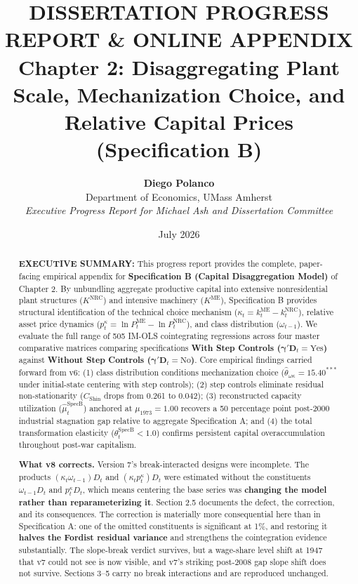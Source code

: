 \documentclass[11pt,a4paper]{article}
\title{\textbf{DISSERTATION PROGRESS REPORT \& ONLINE APPENDIX} \\[0.5em] \Large \textbf{Chapter 2: Disaggregating Plant Scale, Mechanization Choice, and Relative Capital Prices (Specification B)}}
\author{\textbf{Diego Polanco} \\ Department of Economics, UMass Amherst \\ \textit{Executive Progress Report for Michael Ash and Dissertation Committee}}
\date{July 2026}
\begin{document}
\maketitle

\begin{abstract}
\noindent \textbf{EXECUTIVE SUMMARY:} This progress report provides the complete, paper-facing empirical appendix for \textbf{Specification B (Capital Disaggregation Model)} of Chapter 2. By unbundling aggregate productive capital into extensive nonresidential plant structures ($K^{\text{NRC}}$) and intensive machinery ($K^{\text{ME}}$), Specification B provides structural identification of the technical choice mechanism ($\kappa_t = k^{\text{ME}}_t - k^{\text{NRC}}_t$), relative asset price dynamics ($p_t^{\kappa} = \ln P^{\text{ME}}_t - \ln P^{\text{NRC}}_t$), and class distribution ($\omega_{t-1}$). We evaluate the full range of 505 IM-OLS cointegrating regressions across four master comparative matrices comparing specifications \textbf{With Step Controls ($\boldsymbol{\gamma}'\mathbf{D}_t = \text{Yes}$)} against \textbf{Without Step Controls ($\boldsymbol{\gamma}'\mathbf{D}_t = \text{No}$)}. Core empirical findings carried forward from v6: (1) class distribution conditions mechanization choice ($\hat{\theta}_{\omega \kappa} = 15.40^{***}$ under initial-state centering with step controls); (2) step controls eliminate residual non-stationarity ($C_{\text{Shin}}$ drops from 0.261 to 0.042); (3) reconstructed capacity utilization ($\hat{\mu}_t^{\text{SpecB}}$) anchored at $\mu_{1973} = 1.00$ recovers a 50 percentage point post-2000 industrial stagnation gap relative to aggregate Specification A; and (4) the total transformation elasticity ($\theta_t^{\text{SpecB}} < 1.0$) confirms persistent capital overaccumulation throughout post-war capitalism.

\noindent \textbf{What v8 corrects.} Version 7's break-interacted designs were incomplete. The products $(\kappa_t\omega_{t-1})D_t$ and $(\kappa_t p_t^{\kappa})D_t$ were estimated without the constituents $\omega_{t-1}D_t$ and $p_t^{\kappa}D_t$, which means centering the base series was \textbf{changing the model rather than reparameterizing it}. Section 2.5 documents the defect, the correction, and its consequences. The correction is materially more consequential here than in Specification A: one of the omitted constituents is significant at 1\%, and restoring it \textbf{halves the Fordist residual variance} and strengthens the cointegration evidence substantially. The slope-break verdict survives, but a wage-share level shift at 1947 that v7 could not see is now visible, and v7's striking post-2008 gap slope shift does not survive. Sections 3--5 carry no break interactions and are reproduced unchanged.
\end{abstract}
\end{document}
